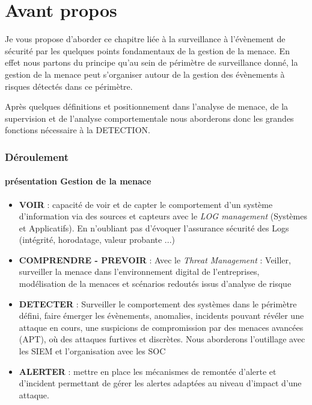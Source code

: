 

\section{Avant propos}
Je vous propose d'aborder ce chapitre liée à la surveillance à l'évènement de sécurité par les quelques points fondamentaux de la gestion de la menace.
En effet nous partons du principe qu'au sein de périmètre de surveillance donné, la gestion de la menace peut s'organiser autour de la gestion des évènements à risques détectés dans ce périmètre.

Après quelques définitions et positionnement dans l'analyse de menace,  de la supervision et de l'analyse comportementale nous aborderons donc les grandes fonctions nécessaire à la DETECTION.


\begin{frame}
\frametitle<presentation>{Déroulement}
\framesubtitle<presentation>{présentation Gestion de la menace}
\begin{itemize}
  \item \textbf{VOIR} :  capacité de voir et de capter le comportement d'un système d'information via des sources et capteurs avec le \textit{LOG management} (Systèmes et Applicatifs). En n'oubliant pas d'évoquer l'assurance sécurité des Logs (intégrité, horodatage, valeur probante ...)
\item \textbf{COMPRENDRE - PREVOIR} : Avec le \textit{Threat Management} : Veiller, surveiller la menace dans l'environnement digital de l'entreprises, modélisation de la menaces et scénarios redoutés issus d'analyse de risque
\item \textbf{DETECTER} : Surveiller le comportement des systèmes dans le périmètre défini, faire émerger les  évènements, anomalies, incidents pouvant révéler une attaque en cours, une suspicions de compromission par des menaces avancées (APT), où des attaques furtives et discrètes. Nous aborderons l'outillage avec les SIEM et l'organisation avec les SOC
\item \textbf{ALERTER} : mettre en place les mécanismes de remontée d'alerte et d'incident permettant de gérer les alertes adaptées au niveau d'impact d'une attaque. 
\end{itemize}

\end{frame}

